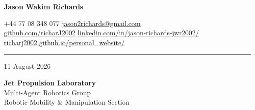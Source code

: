 \documentclass[10pt,a4paper]{article}
\newcommand{\NameSize}{20pt}
\newcommand{\ContactSize}{8pt}
\newcommand{\MetaSize}{8.8pt}
\newcommand{\NameLineSize}{20pt}
\newcommand{\KeywordLineSize}{9pt}
\newcommand{\ContactLineSize}{8pt}
\newcommand{\MetaLineSize}{10.5pt}
\newcommand{\HeaderContactToLine}{2pt}
\newcommand{\HeaderLineToDate}{8pt}
\newcommand{\DateAfter}{22pt}             %
\newcommand{\HeaderLineThickness}{0.5pt}
\begin{document}

\begin{center}



    {
        \fontsize{\NameSize}{\NameLineSize}\selectfont
        \textbf{\textcolor{CVBlack}{Jason Wakim Richards}}
    }


    \vspace{\KeywordLineSize}

    {
        \fontsize{\ContactSize}{\ContactLineSize}
        \selectfont
        \textcolor{CVBlack}
        {
            +44 77 08 348 077
            \quad\textbar\quad
            \href{mailto:jason2richards@gmail.com}{jason2richards@gmail.com}
            \\
            \href{https://github.com/richarJ2002}{github.com/richarJ2002}
            \quad\textbar\quad
            \href{https://www.linkedin.com/in/jason-richards-jwr2002/}
            {linkedin.com/in/jason-richards-jwr2002/}
            \quad\textbar\quad
            \href{https://richarj2002.github.io/personal_website/}{richarj2002.github.io/personal\_website/}
        }
    }

\end{center}

\vspace{\HeaderContactToLine}
\noindent\textcolor{CVBlack}{\rule{\textwidth}{\HeaderLineThickness}}


\vspace{\HeaderLineToDate}

{\fontsize{\MetaSize}{\MetaLineSize}\selectfont
    \textcolor{CVGray}{11 August 2026}}

\vspace{\DateAfter}

{\fontsize{\MetaSize}{\MetaLineSize}\selectfont
    \textbf{\textcolor{CVBlack}{Jet Propulsion Laboratory}}\\
    \textcolor{CVDarkGray}{Multi-Agent Robotics Group}\\
    \textcolor{CVDarkGray}{Robotic Mobility \& Manipulation Section}}
\end{document}
